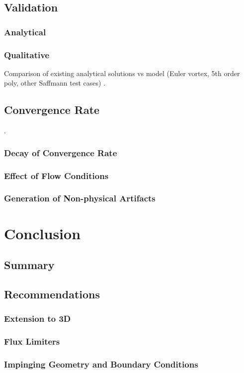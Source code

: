 \documentclass[letterpaper,12pt]{report}
\begin{document}
\section{Validation}
\subsection{Analytical}
\subsection{Qualitative}
Comparison of existing analytical solutions vs model (Euler vortex, 5th order poly, other Saffmann test cases)
\newpage.
\newpage
\section{Convergence Rate}
\newpage.
\subsection{Decay of Convergence Rate}
\newpage
\subsection{Effect of Flow Conditions}
\subsection{Generation of Non-physical Artifacts}

\chapter{Conclusion}
\section{Summary}
\section{Recommendations}
\subsection{Extension to 3D}
\newpage
\subsection{Flux Limiters}
\subsection{Impinging Geometry and Boundary Conditions}
\end{document}

